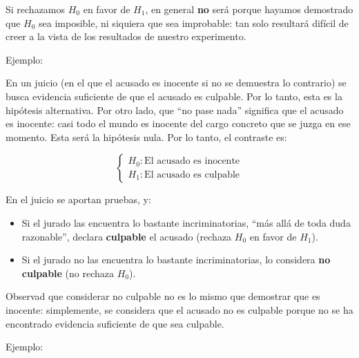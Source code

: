 \documentclass[
  spanish,
  letterpaper,
  DIV=11,
  numbers=noendperiod]{scrreprt}
\begin{document}
\begin{tcolorbox}[enhanced jigsaw, arc=.35mm, bottomrule=.15mm, bottomtitle=1mm, breakable, colback=white, colbacktitle=quarto-callout-warning-color!10!white, colframe=quarto-callout-warning-color-frame, coltitle=black, left=2mm, leftrule=.75mm, opacityback=0, opacitybacktitle=0.6, rightrule=.15mm, title=\textcolor{quarto-callout-warning-color}{\faExclamationTriangle}\hspace{0.5em}{Advertencia}, titlerule=0mm, toprule=.15mm, toptitle=1mm]

Si rechazamos \(H_0\) en favor de \(H_1\), en general \textbf{no} será
porque hayamos demostrado que \(H_0\) sea imposible, ni siquiera que sea
improbable: tan solo resultará difícil de creer a la vista de los
resultados de nuestro experimento.

\end{tcolorbox}

Ejemplo:

En un juicio (en el que el acusado es inocente si no se demuestra lo
contrario) se busca evidencia suficiente de que el acusado es culpable.
Por lo tanto, esta es la hipótesis alternativa. Por otro lado, que ``no
pase nada'' significa que el acusado es inocente: casi todo el mundo es
inocente del cargo concreto que se juzga en ese momento. Esta será la
hipótesis nula. Por lo tanto, el contraste es:

\[
\left\{\begin{array}{ll} 
H_{0}:\text{El acusado es inocente}\\ 
H_{1}:\text{El acusado es culpable}
\end{array}
\right.
\]

En el juicio se aportan pruebas, y:

\begin{itemize}
\item
  Si el jurado las encuentra lo bastante incriminatorias, ``más allá de
  toda duda razonable'', declara \textbf{culpable} el acusado (rechaza
  \(H_0\) en favor de \(H_1\)).
\item
  Si el jurado no las encuentra lo bastante incriminatorias, lo
  considera \textbf{no culpable} (no rechaza \(H_{0}\)).
\end{itemize}

Observad que considerar no culpable no es lo mismo que demostrar que es
inocente: simplemente, se considera que el acusado no es culpable porque
no se ha encontrado evidencia suficiente de que sea culpable.

Ejemplo:
\end{document}
